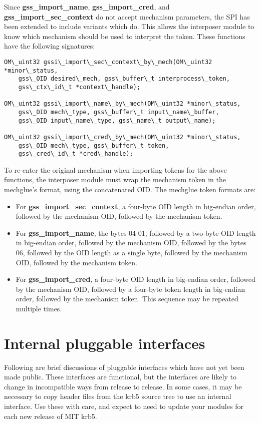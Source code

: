 \documentclass[letterpaper,10pt,english]{sphinxmanual}
\begin{document}
Since \textbf{gss\_import\_name}, \textbf{gss\_import\_cred}, and
\textbf{gss\_import\_sec\_context} do not accept mechanism parameters, the SPI
has been extended to include variants which do.  This allows the
interposer module to know which mechanism should be used to interpret
the token.  These functions have the following signatures:

\begin{Verbatim}[commandchars=\\\{\}]
OM\_uint32 gssi\_import\_sec\_context\_by\_mech(OM\_uint32 *minor\_status,
    gss\_OID desired\_mech, gss\_buffer\_t interprocess\_token,
    gss\_ctx\_id\_t *context\_handle);

OM\_uint32 gssi\_import\_name\_by\_mech(OM\_uint32 *minor\_status,
    gss\_OID mech\_type, gss\_buffer\_t input\_name\_buffer,
    gss\_OID input\_name\_type, gss\_name\_t output\_name);

OM\_uint32 gssi\_import\_cred\_by\_mech(OM\_uint32 *minor\_status,
    gss\_OID mech\_type, gss\_buffer\_t token,
    gss\_cred\_id\_t *cred\_handle);
\end{Verbatim}

To re-enter the original mechanism when importing tokens for the above
functions, the interposer module must wrap the mechanism token in the
mechglue's format, using the concatenated OID.  The mechglue token
formats are:
\begin{itemize}
\item {} 
For \textbf{gss\_import\_sec\_context}, a four-byte OID length in big-endian
order, followed by the mechanism OID, followed by the mechanism
token.

\item {} 
For \textbf{gss\_import\_name}, the bytes 04 01, followed by a two-byte OID
length in big-endian order, followed by the mechanism OID, followed
by the bytes 06, followed by the OID length as a single byte,
followed by the mechanism OID, followed by the mechanism token.

\item {} 
For \textbf{gss\_import\_cred}, a four-byte OID length in big-endian order,
followed by the mechanism OID, followed by a four-byte token length
in big-endian order, followed by the mechanism token.  This sequence
may be repeated multiple times.

\end{itemize}


\section{Internal pluggable interfaces}
\label{plugindev/internal::doc}\label{plugindev/internal:internal-pluggable-interfaces}
Following are brief discussions of pluggable interfaces which have not
yet been made public.  These interfaces are functional, but the
interfaces are likely to change in incompatible ways from release to
release.  In some cases, it may be necessary to copy header files from
the krb5 source tree to use an internal interface.  Use these with
care, and expect to need to update your modules for each new release
of MIT krb5.
\end{document}
